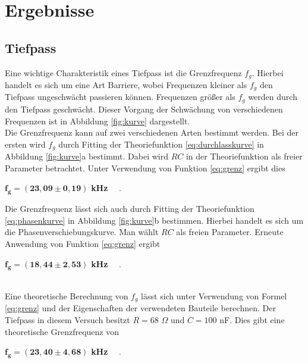 \documentclass[a4paper,usenatbib]{aspdoc}
\begin{document}
        
            
    \section{Ergebnisse}\label{sec:result}
        \subsection{Tiefpass}\label{subsec:result_tiefpass}
            Eine wichtige Charakteristik eines Tiefpass ist die Grenzfrequenz $f_g$. Hierbei handelt es sich um eine Art Barriere, wobei Frequenzen kleiner als $f_g$ den Tiefpass ungeschwächt passieren können. Frequenzen größer als $f_g$ werden durch den Tiefpass geschwächt. Dieser Vorgang der Schwächung von verschiedenen Frequenzen ist in Abbildung \ref{fig:kurve} dargestellt.
            \\
            Die Grenzfrequenz kann auf zwei verschiedenen Arten bestimmt werden. Bei der ersten wird $f_g$ durch Fitting der Theoriefunktion \ref{eq:durchlasskurve} in Abbildung \ref{fig:kurve}a bestimmt. Dabei wird $RC$ in der Theoriefunktion als freier Parameter betrachtet. Unter Verwendung von Funktion \ref{eq:grenz} ergibt dies 
            \begin{center}
                $\mathbf{f_g = (23,09 \pm 0,19)}$ \textbf{kHz} $\quad$.    
            \end{center}
            Die Grenzfrequenz lässt sich auch durch Fitting der Theoriefunktion \ref{eq:phasenkurve} in Abbildung \ref{fig:kurve}b bestimmen. Hierbei handelt es sich um die Phasenverschiebungskurve. Man wählt $RC$ als freien Parameter. Erneute Anwendung von Funktion \ref{eq:grenz} ergibt 
            \begin{center}
                $\mathbf{f_g = (18,44 \pm 2,53)}$ \textbf{kHz} $\quad$.    
            \end{center}
            \\
            Eine theoretische Berechnung von $f_g$ lässt sich unter Verwendung von Formel \ref{eq:grenz} und der Eigenschaften der verwendeten Bauteile berechnen. Der Tiefpass in diesem Versuch besitzt $R = 68$ $\Omega$ und $C = 100$ nF. Dies gibt eine theoretische Grenzfrequenz von 
            \begin{center}
                $\mathbf{f_g = (23,40 \pm 4,68)}$ \textbf{kHz} $\quad$.    
            \end{center}
            
        
\end{document}
